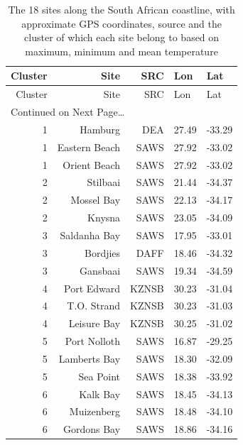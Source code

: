\documentclass[10pt,A4,]{article}
\begin{document}
\begin{tiny}
\begin{center}
\setlength\tabcolsep{4pt}
\begin{longtable}{|r|r|r|l|p{6cm}|}
\caption{The 18 sites along the South African coastline, with approximate GPS coordinates, source and the cluster of which each site belong to based on maximum, minimum and mean temperature} \\

\toprule
Cluster & Site & SRC & Lon & Lat  \\
\midrule
\endfirsthead

\toprule
Cluster & Site & SRC & Lon & Lat  \\
\midrule
\endhead

\midrule
\multicolumn{5}{l}{{Continued on Next Page\ldots}} \\
\endfoot

\bottomrule
\endlastfoot


1 & Hamburg & DEA & 27.49 & -33.29 \\
1 & Eastern Beach & SAWS & 27.92 & -33.02 \\
1 & Orient Beach & SAWS & 27.92 & -33.02 \\
2 & Stilbaai & SAWS & 21.44 & -34.37 \\
2 & Mossel Bay & SAWS & 22.13 & -34.17 \\
2 & Knysna & SAWS & 23.05 & -34.09 \\
3 & Saldanha Bay & SAWS & 17.95 & -33.01 \\
3 & Bordjies & DAFF & 18.46 & -34.32 \\
3 & Gansbaai & SAWS & 19.34 & -34.59 \\
4 & Port Edward & KZNSB & 30.23 & -31.04 \\
4 & T.O. Strand & KZNSB & 30.23 & -31.03 \\
4 & Leisure Bay & KZNSB & 30.25 & -31.02 \\
5 & Port Nolloth & SAWS & 16.87 & -29.25 \\
5 & Lamberts Bay & SAWS & 18.30 & -32.09 \\
5 & Sea Point & SAWS & 18.38 & -33.92 \\
6 & Kalk Bay & SAWS & 18.45 & -34.13 \\
6 & Muizenberg & SAWS & 18.48 & -34.10 \\
6 & Gordons Bay & SAWS & 18.86 & -34.16 \\

\end{longtable}
\end{center}
\end{tiny}
\end{document}
